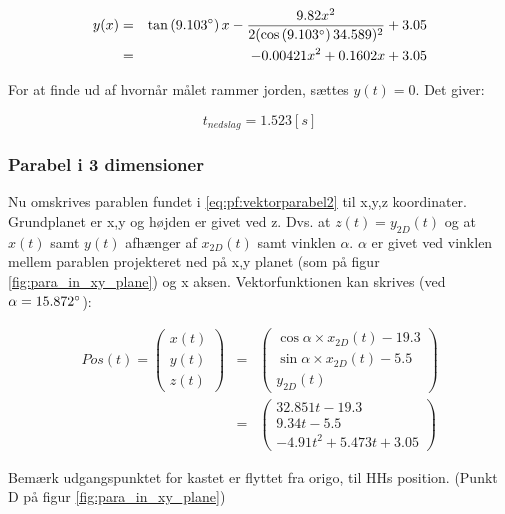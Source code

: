 \begin{eqnarray}
y(x) &=& \tan \left(9.103 \degree \right) x - \frac{9.82x^2}{2(\cos \left(9.103 \degree \right) 34.589)^2} + 3.05 \\
&=& - 0.00421 x^2 + 0.1602 x  + 3.05
\label{eq:pf:y(x)3}
\end{eqnarray}

For at finde ud af hvornår målet rammer jorden, sættes $y(t) = 0$. Det giver:

\begin{equation}
t_{nedslag} = 1.523 [s]
\label{eq:pf:nedslagstid}
\end{equation}

\subsubsection{Parabel i 3 dimensioner}
Nu omskrives parablen fundet i \ref{eq:pf:vektorparabel2} til x,y,z koordinater. 
Grundplanet er x,y og højden er givet ved z. Dvs. at $z(t) = y_{2D}(t)$ og at $x(t)$ samt $y(t)$ afhænger af $x_{2D}(t)$ samt vinklen $\alpha$. 
$\alpha$ er givet ved vinklen mellem parablen projekteret ned på x,y planet (som på figur \ref{fig:para_in_xy_plane}) og x aksen. 
Vektorfunktionen kan skrives (ved $\alpha = 15.872 \degree$): 

\begin{eqnarray}
Pos(t) = \left( \begin{array}{c}
	x(t) \\
	y(t) \\
	z(t)
	\end{array}
	\right)
	&=& \left( \begin{array}{c}
	\cos \alpha \times x_{2D}(t) - 19.3 \\
	\sin \alpha \times x_{2D}(t) - 5.5 \\
	y_{2D}(t)
	\end{array}
	\right) \\
	&=& \left( \begin{array}{c}
	32.851 t - 19.3 \\
	9.34 t - 5.5 \\
	- 4.91 t^2 + 5.473 t + 3.05
	\end{array}
	\right)
\label{eq:pf:vektorparabel3d}
\end{eqnarray}


Bemærk udgangspunktet for kastet er flyttet fra origo, til HHs position. (Punkt D på figur \ref{fig:para_in_xy_plane})
